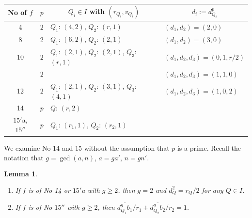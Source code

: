\documentclass[a4paper,11pt]{amsart}
\newtheorem{lemma}[theorem]{Lemma}
\theoremstyle{definition}
\theoremstyle{remark}
\numberwithin{equation}{section}
\begin{document}
\begin{table}[ht]
\caption{}\label{tbl:ramification_again}
\begin{tabular}{c|c|l|l}
\hline
No of $f$ & $p$ & \multicolumn{1}{c|}{$Q_i \in I$ with $(r_{Q_i},v_{Q_i})$} &
\multicolumn{1}{c}{$d_i:=d_{Q_i}^p$} \\
\hline
4  & $2$ & $Q_1$: $(4,2)$, $Q_2$: $(r,1)$    & $(d_1,d_2)=(2,0)$ \\
8  & $2$ & $Q_1$: $(6,2)$, $Q_2$: $(2,1)$    & $(d_1,d_2)=(3,0)$ \\
10 & $2$ & $Q_1$: $(2,1)$, $Q_2$: $(2,1)$, $Q_3$: $(r,1)$ &
$(d_1,d_2,d_3)=(0,1,r/2)$ \\
   & $2$ & & $(d_1,d_2,d_3)=(1,1,0)$ \\
12 & $2$ & $Q_1$: $(2,1)$, $Q_2$: $(3,1)$, $Q_3$: $(4,1)$ &
$(d_1,d_2,d_3)=(1,0,2)$ \\
14 & $p$ & $Q$: $(r,2)$                       & \\
$\textrm{15}'$a, $\textrm{15}''$
   & $p$ & $Q_1$: $(r_1,1)$, $Q_2$: $(r_2,1)$ & \\
\hline
\end{tabular}
\end{table}

We examine No 14 and 15 without the assumption that $p$ is a prime.
Recall the notation that $g=\gcd(a, n)$, $a=ga'$, $n=gn'$.

\begin{lemma}\label{lem:d_Q}
\begin{enumerate}
\item\label{itm:d_Q_sp}
If $f$ is of No 14 or $\textrm{15}'$a with $g\ge2$,
then $g=2$ and $d_Q^2=r_Q/2$ for any $Q \in I$.
\item\label{itm:d_Q_ge}
If $f$ is of No $\textrm{15}''$ with $g\ge2$,
then $\overline{d_{Q_1}^gb_1}/r_1+\overline{d_{Q_2}^gb_2}/r_2=1$.
\end{enumerate}
\end{lemma}
\end{document}
